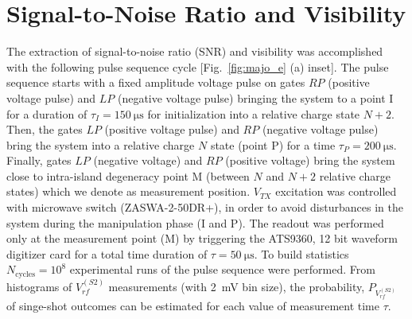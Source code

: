 \section{Signal-to-Noise Ratio and Visibility}
\label{sec:majo_C}
The extraction of signal-to-noise ratio (SNR) and visibility was accomplished with the following pulse sequence cycle [Fig.~\ref{fig:majo_e} (a) inset]. The pulse sequence starts with a fixed amplitude voltage pulse on gates $RP$ (positive voltage pulse) and $LP$ (negative voltage pulse) bringing the system to a point I for a duration of $\tau_{I} = \SI{150}{\micro\second}$ for initialization into a relative charge state $N+2$. Then, the gates $LP$ (positive voltage pulse) and $RP$ (negative voltage pulse) bring the system into a relative charge $N$ state (point P) for a time $\tau_{P} = \SI{200}{\micro\second}$. Finally, gates $LP$ (negative voltage) and $RP$ (positive voltage) bring the system close to intra-island degeneracy point M (between $N$ and $N+2$ relative charge states) which we denote as measurement position. $V_{TX}$ excitation was controlled with microwave switch (ZASWA-2-50DR+), in order to avoid disturbances in the system during the manipulation phase (I and P). The readout was performed only at the measurement point (M) by triggering the ATS9360, 12 bit waveform digitizer card for a total time duration of $\tau = \SI{50}{\micro\second}$.  To build statistics $N_\textrm{cycles} = 10^8$ experimental runs of the pulse sequence were performed. From histograms of $V^{(S2)}_{rf}$ measurements (with \SI{2}{\milli\volt} bin size), the probability, $P_{V^{(S2)}_{rf}}$ of singe-shot outcomes can be estimated for each value of measurement time $\tau$.

